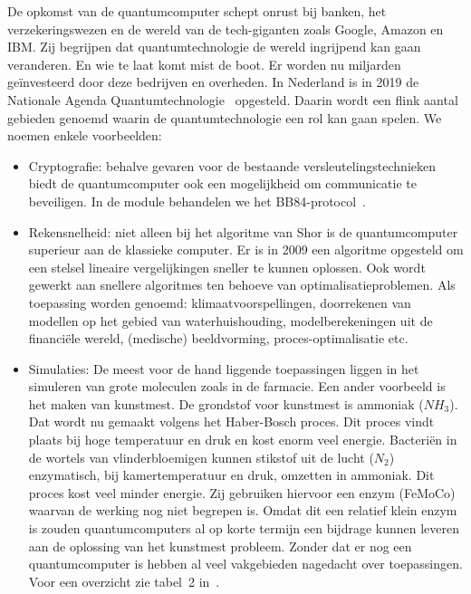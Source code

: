 \documentclass[../../main.tex]{subfiles}
\begin{document}
De opkomst van de quantumcomputer schept onrust bij banken, het verzekeringswezen en de wereld van de tech-giganten zoals Google, Amazon en IBM. Zij  begrijpen dat quantumtechnologie de wereld ingrijpend kan gaan veranderen. En wie te laat komt mist de boot. Er worden nu miljarden ge\"investeerd door deze bedrijven en overheden. In Nederland is in 2019 de Nationale Agenda Quantumtechnologie~\cite{agenda2019} opgesteld. Daarin wordt een flink aantal gebieden genoemd waarin de quantumtechnologie een rol kan gaan spelen. We noemen enkele voorbeelden:

\begin{itemize}
\item Cryptografie: behalve gevaren voor de bestaande versleutelingstechnieken biedt de quantumcomputer ook een mogelijkheid om communicatie te beveiligen. In de module behandelen we het  BB84-protocol~\cite{BENNETT20147}. 
\item Rekensnelheid: niet alleen bij het algoritme van Shor is de quantumcomputer superieur aan de klassieke computer. Er is in 2009 een algoritme opgesteld om een stelsel lineaire vergelijkingen sneller te kunnen oplossen. Ook wordt gewerkt aan snellere algoritmes ten behoeve van optimalisatieproblemen. Als toepassing worden genoemd: klimaatvoorspellingen, doorrekenen van modellen op het gebied van waterhuishouding, modelberekeningen uit de financiële wereld, (medische) beeldvorming, proces-optimalisatie etc.

\item Simulaties: De meest voor de hand liggende toepassingen liggen in het simuleren van grote moleculen zoals in de farmacie. Een ander voorbeeld is het maken van kunstmest. De grondstof voor kunstmest is ammoniak ($NH_3$). Dat wordt nu gemaakt volgens het Haber-Bosch proces. Dit proces vindt plaats bij hoge temperatuur en druk en kost enorm veel energie. Bacteri\"en in de wortels van vlinderbloemigen kunnen stikstof uit de lucht ($N_2$) enzymatisch, bij kamertemperatuur en druk, omzetten in ammoniak. Dit proces kost veel minder energie. Zij gebruiken hiervoor een enzym (FeMoCo) waarvan de werking nog niet begrepen is. Omdat dit een relatief klein enzym is zouden quantumcomputers al op korte termijn een bijdrage kunnen leveren aan de oplossing van het kunstmest probleem.
Zonder dat er nog een quantumcomputer is hebben al veel vakgebieden nagedacht over toepassingen. Voor een overzicht zie tabel~2 in~\cite{Georgescu2014}.
\end{itemize}
\end{document}

